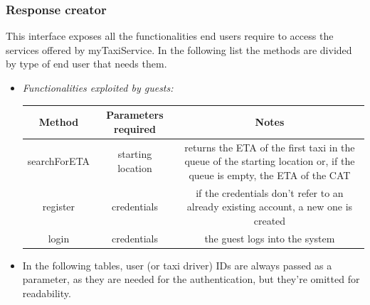 \documentclass{article}
\begin{document}
	\subsubsection{Response creator}
	This interface exposes all the functionalities end users require to access the services offered by myTaxiService. 
	In the following list the methods are divided by type of end user that needs them. 
	\begin{itemize}
		\item \textit{Functionalities exploited by guests:}	\\
		\begin{table}[H]
			\begin{adjustbox}{width=1.2\textwidth}
				\begin{tabular}{*{3}{c}}
					\toprule
					Method & Parameters required & Notes \\
					\midrule
					searchForETA & starting location & returns the ETA of the first taxi in the queue of the starting location or, if the queue is empty, the ETA of the CAT\\ %
					register & credentials & if the credentials don't refer to an already existing account, a new one is created \\
					login & credentials & the guest logs into the system \\
					\bottomrule
				\end{tabular}
			\end{adjustbox}
		\end{table}
		
		\item In the following tables, user (or taxi driver) IDs are always passed as a parameter, as they are needed for the authentication, but they're omitted for readability. \\	
		

\end{itemize}
\end{document}
